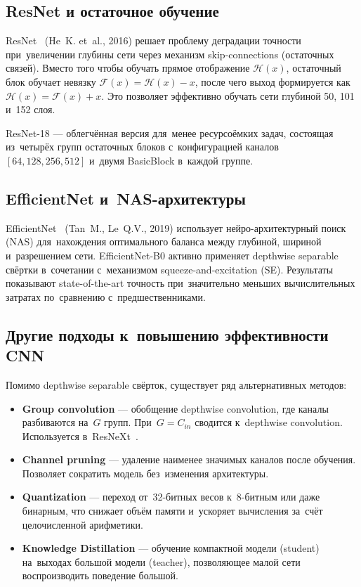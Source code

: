 \subsection{ResNet и остаточное обучение}

ResNet~\cite{resnet} (He~K. et~al., 2016) решает проблему деградации точности при~увеличении глубины сети через механизм skip-connections (остаточных связей). Вместо того чтобы обучать прямое отображение $\mathcal{H}(x)$, остаточный блок обучает невязку $\mathcal{F}(x) = \mathcal{H}(x) - x$, после чего выход формируется как $\mathcal{H}(x) = \mathcal{F}(x) + x$. Это позволяет эффективно обучать сети глубиной 50, 101 и~152 слоя.

ResNet-18 — облегчённая версия для~менее ресурсоёмких задач, состоящая из~четырёх групп остаточных блоков с~конфигурацией каналов $[64, 128, 256, 512]$ и~двумя BasicBlock в~каждой группе.

\subsection{EfficientNet и~NAS-архитектуры}

EfficientNet~\cite{efficientnet} (Tan~M., Le~Q.V., 2019) использует нейро-архитектурный поиск (NAS) для~нахождения оптимального баланса между глубиной, шириной и~разрешением сети. EfficientNet-B0 активно применяет depthwise separable свёртки в~сочетании с~механизмом squeeze-and-excitation (SE). Результаты показывают state-of-the-art точность при~значительно меньших вычислительных затратах по~сравнению с~предшественниками.

\subsection{Другие подходы к~повышению эффективности CNN}

Помимо depthwise separable свёрток, существует ряд альтернативных методов:

\begin{itemize}
    \item \textbf{Group convolution} — обобщение depthwise convolution, где каналы разбиваются на~$G$ групп. При~$G=C_{in}$ сводится к~depthwise convolution. Используется в~ResNeXt~\cite{resnext}.
    \item \textbf{Channel pruning} — удаление наименее значимых каналов после обучения. Позволяет сократить модель без~изменения архитектуры.
    \item \textbf{Quantization} — переход от~32-битных весов к~8-битным или даже бинарным, что снижает объём памяти и~ускоряет вычисления за~счёт целочисленной арифметики.
    \item \textbf{Knowledge Distillation} — обучение компактной модели (student) на~выходах большой модели (teacher), позволяющее малой сети воспроизводить поведение большой.
\end{itemize}

